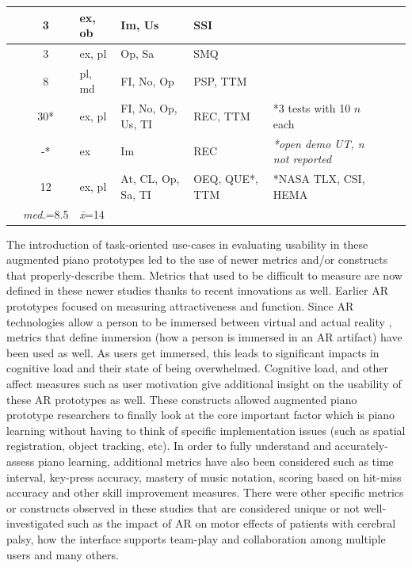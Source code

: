 \documentclass[sigconf, screen, review]{acmart}
\begin{document}
\begin{table}[t]
\begin{tabularx}{\textwidth}{lclllllX}
\cite{xiao2011duet}                  & 3            & ex, ob      & Im, Us                 & SSI                   &   \\ \hline 
\cite{ogata2017keyboard}             & 3            & ex, pl      & Op, Sa                 & SMQ                   &   \\ \hline 
\cite{mcpherson2013space}            & 8            & pl, md      & FI, No, Op             & PSP, TTM              &   \\ \hline 
\cite{mcpherson2011multidimensional} & 30*           & ex, pl      & FI, No, Op, Us, TI     & REC, TTM              & *3 tests with 10 $n$ each  \\ \hline 
\cite{granieri2019reach}             & -*           & ex          & Im                     & REC                   & \textit{*open demo UT, n not reported}  \\ \hline 
\cite{karolus2020hit}                & 12           & ex, pl      & At, CL, Op, Sa, TI     & OEQ, QUE*, TTM                  &  *NASA TLX\cite{hart1988development}, CSI\cite{carroll2009creativity}, HEMA\cite{huta2010pursuing} \\ \midrule 
                                   & \textit{med.}=8.5 & \textit{\={x}}=14   &                   &                       & \\ \bottomrule
\end{tabularx}%
\end{table}

The introduction of task-oriented use-cases in evaluating usability in these augmented piano prototypes led to the use of newer metrics and/or constructs that properly-describe them. Metrics that used to be difficult to measure are now defined in these newer studies thanks to recent innovations as well. Earlier AR prototypes focused on measuring attractiveness and function. Since AR technologies allow a person to be immersed between virtual and actual reality \cite{milgram1995augmented}, metrics that define immersion (how a person is immersed in an AR artifact) have been used as well. As users get immersed, this leads to significant impacts in cognitive load and their state of being overwhelmed. Cognitive load, and other affect measures such as user motivation give additional insight on the usability of these AR prototypes as well. These constructs allowed augmented piano prototype researchers to finally look at the core important factor which is piano learning without having to think of specific implementation issues (such as spatial registration, object tracking, etc). In order to fully understand and accurately-assess piano learning, additional metrics have also been considered such as time interval, key-press accuracy, mastery of music notation, scoring based on hit-miss accuracy and other skill improvement measures. There were other specific metrics or constructs observed in these studies that are considered unique or not well-investigated such as the impact of AR on motor effects of patients with cerebral palsy, how the interface supports team-play and collaboration among multiple users and many others. 
\end{document}
